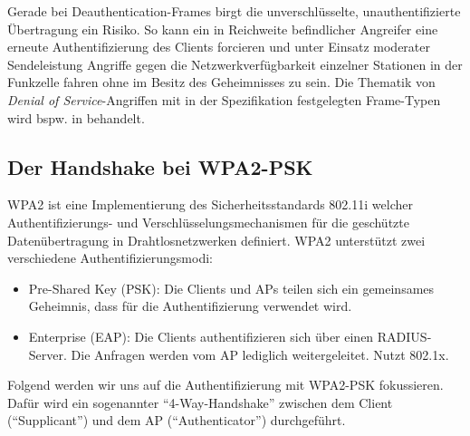 Gerade bei Deauthentication-Frames birgt die unverschlüsselte, unauthentifizierte Über\-tragung ein Risiko.
So kann ein in Reichweite befindlicher Angreifer eine erneute Authentifizierung des Clients forcieren und unter Einsatz moderater Sendeleistung Angriffe gegen die Netzwerkverfügbarkeit einzelner Stationen in der Funkzelle fahren ohne im Besitz des Geheimnisses zu sein. 
Die Thematik von \textit{Denial of Service}-Angriffen mit in der Spezifikation festgelegten Frame-Typen wird bspw. in \cite{bernaschi2008access} behandelt.

\subsection{Der Handshake bei WPA2-PSK}\label{subs:handshake}
WPA2 ist eine Implementierung des Sicherheitsstandards 802.11i welcher Authentifizierungs- und Verschlüsselungsmechanismen für die geschützte Datenübertragung in Drahtlosnetzwerken definiert.
WPA2 unterstützt zwei verschiedene Authentifizierungsmodi: 
\begin{itemize}
	\item Pre-Shared Key (PSK): Die Clients und APs teilen sich ein gemeinsames Geheimnis, dass für die Authentifizierung verwendet wird.
	\item Enterprise (EAP): Die Clients authentifizieren sich über einen RADIUS-Server. Die Anfragen werden vom AP lediglich weitergeleitet. Nutzt 802.1x.
\end{itemize}
Folgend werden wir uns auf die Authentifizierung mit WPA2-PSK fokussieren.
Dafür wird ein sogenannter \enquote{4-Way-Handshake} zwischen dem Client (\enquote{Supplicant}) und dem AP (\enquote{Authenticator}) durchgeführt.

